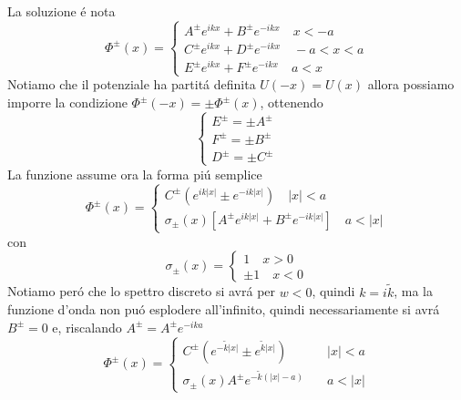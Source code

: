\documentclass[a4paper]{article}
\begin{document}
        La soluzione \'e nota
        \begin{equation*}
            \Phi^\pm(x)=
            \begin{cases}
                A^\pm e^{ikx}+B^\pm e^{-ikx}\quad x<-a\\
                C^\pm e^{ikx}+D^\pm e^{-ikx}\quad -a<x<a\\
                E^\pm e^{ikx}+F^\pm e^{-ikx}\quad a<x
            \end{cases}
        \end{equation*}
        Notiamo che il potenziale ha partit\'a definita $U(-x)=U(x)$ allora possiamo imporre la condizione $\Phi^\pm(-x)=\pm\Phi^\pm(x)$, ottenendo
        \begin{equation*}
            \begin{cases}
                E^\pm=\pm A^\pm\\
                F^\pm=\pm B^\pm\\
                D^\pm=\pm C^\pm
            \end{cases}
        \end{equation*}
        La funzione assume ora la forma pi\'u semplice
        \begin{equation*}
            \Phi^\pm(x)=
            \begin{cases}
                C^\pm \left(e^{ik\left\lvert x\right\rvert }\pm e^{-ik\left\lvert x\right\rvert }\right)\quad \left\lvert x\right\rvert<a\\
                \sigma_\pm(x)\left[A^\pm e^{ik\left\lvert x\right\rvert }+B^\pm e^{-ik\left\lvert x\right\rvert }\right]\quad a<\left\lvert x\right\rvert
            \end{cases}
        \end{equation*}
        con
        \begin{equation*}
            \sigma_\pm(x)=
            \begin{cases}
                1\quad x>0\\
                \pm 1\quad x<0
            \end{cases}
        \end{equation*}
        Notiamo per\'o che lo spettro discreto si avr\'a per $w<0$, quindi $k=i\tilde{k}$, ma la funzione d'onda non pu\'o esplodere all'infinito, quindi necessariamente si avr\'a $B^\pm=0$ e, riscalando $A^\pm=A^\pm e^{-ika}$
        \begin{equation*}
            \Phi^\pm(x)=
            \begin{cases}
                C^\pm \left(e^{-\tilde{k}\left\lvert x\right\rvert }\pm e^{\tilde{k}\left\lvert x\right\rvert }\right)\quad &\left\lvert x\right\rvert<a\\
                \sigma_\pm(x)A^\pm e^{-\tilde{k}(\left\lvert x\right\rvert-a)}\quad &a<\left\lvert x\right\rvert
            \end{cases}
        \end{equation*}
\end{document}
